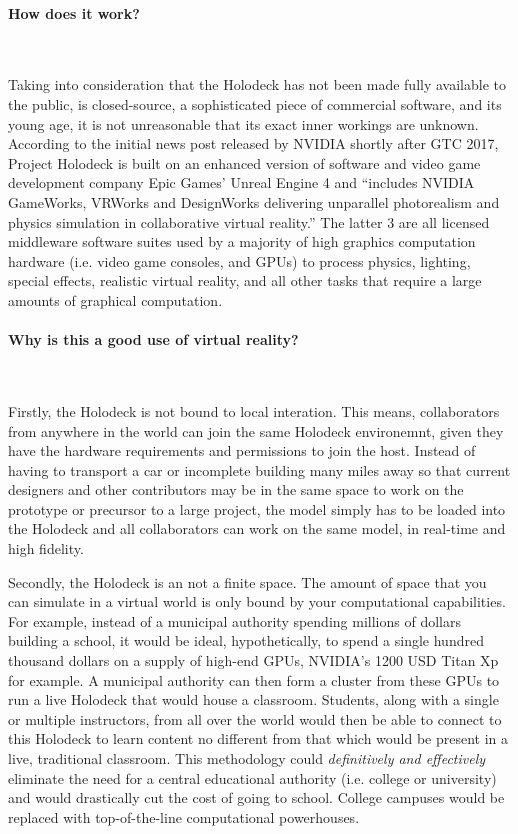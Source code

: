 \documentclass[11pt]{article}
\begin{document}
\paragraph{How does it work?} ~ \par 
Taking into consideration that the Holodeck has not been made fully available to the public, is closed-source, a sophisticated piece of commercial software, and its young age, it is not unreasonable that its exact inner workings are unknown. According to the initial news post released by NVIDIA shortly after GTC 2017, \cite{nvidiablog1} Project Holodeck is built on an enhanced version of software and video game development company Epic Games' Unreal Engine 4 and ``includes NVIDIA GameWorks, VRWorks and DesignWorks delivering unparallel photorealism and physics simulation in collaborative virtual reality.'' The latter 3 are all licensed middleware software suites used by a majority of high graphics computation hardware (i.e. video game consoles, and GPUs) to process physics, lighting, special effects, realistic virtual reality, and all other tasks that require a large amounts of graphical computation.

\paragraph{Why is this a good use of virtual reality?} ~ \par 
Firstly, the Holodeck is not bound to local interation. This means, collaborators from anywhere in the world can join the same Holodeck environemnt, given they have the hardware requirements and permissions to join the host. Instead of having to transport a car or incomplete building many miles away so that current designers and other contributors may be in the same space to work on the prototype or precursor to a large project, the model simply has to be loaded into the Holodeck and all collaborators can work on the same model, in real-time and high fidelity. 

Secondly, the Holodeck is an not a finite space. The amount of space that you can simulate in a virtual world is only bound by your computational capabilities. For example, instead of a municipal authority spending millions of dollars building a school, it would be ideal, hypothetically, to spend a single hundred thousand dollars on a supply of high-end GPUs, NVIDIA's 1200 USD Titan Xp for example. A municipal authority can then form a cluster from these GPUs to run a live Holodeck that would house a classroom. Students, along with a single or multiple instructors, from all over the world would then be able to connect to this Holodeck to learn content no different from that which would be present in a live, traditional classroom. This methodology could \emph{definitively and effectively} eliminate the need for a central educational authority (i.e. college or university) and would drastically cut the cost of going to school. College campuses would be replaced with top-of-the-line computational powerhouses.
\end{document}
